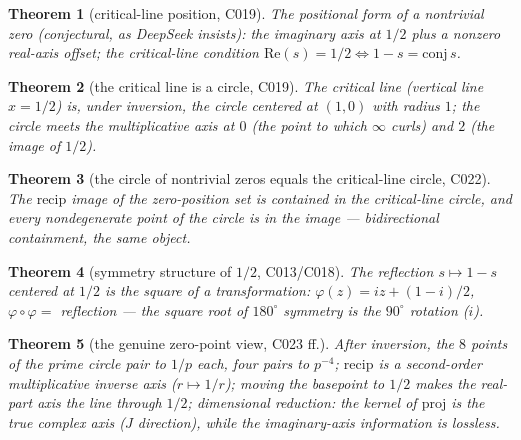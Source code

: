 \documentclass[11pt]{article}
\newtheorem{theorem}{Theorem}
\theoremstyle{remark}
\begin{document}
\begin{theorem}[critical-line position, C019]
\label{thm:position}
The positional form of a nontrivial zero (conjectural, as DeepSeek insists):
the imaginary axis at $1/2$ plus a nonzero real-axis offset; the
critical-line condition $\mathrm{Re}(s)=1/2 \iff 1-s=\mathrm{conj}\,s$.
\end{theorem}

\begin{theorem}[the critical line is a circle, C019]
\label{thm:circle}
The critical line (vertical line $x=1/2$) is, under inversion, the circle
centered at $(1,0)$ with radius $1$; the circle meets the multiplicative axis
at $0$ (the point to which $\infty$ curls) and $2$ (the image of $1/2$).
\end{theorem}

\begin{theorem}[the circle of nontrivial zeros equals the critical-line circle, C022]
\label{thm:zeroCircle}
The $\mathrm{recip}$ image of the zero-position set is contained in the
critical-line circle, and every nondegenerate point of the circle is in the
image --- bidirectional containment, the same object.
\end{theorem}

\begin{theorem}[symmetry structure of $1/2$, C013/C018]
\label{thm:symmetry}
The reflection $s\mapsto 1-s$ centered at $1/2$ is the square of a
transformation: $\varphi(z)=iz+(1-i)/2$, $\varphi\circ\varphi=$ reflection ---
the square root of $180^\circ$ symmetry is the $90^\circ$ rotation ($i$).
\end{theorem}

\begin{theorem}[the genuine zero-point view, C023 ff.]
\label{thm:genzero}
After inversion, the $8$ points of the prime circle pair to $1/p$ each, four
pairs to $p^{-4}$; $\mathrm{recip}$ is a second-order multiplicative inverse
axis ($r\mapsto 1/r$); moving the basepoint to $1/2$ makes the real-part axis
the line through $1/2$; dimensional reduction: the kernel of $\mathrm{proj}$
is the true complex axis ($J$ direction), while the imaginary-axis
information is lossless.
\end{theorem}
\end{document}
